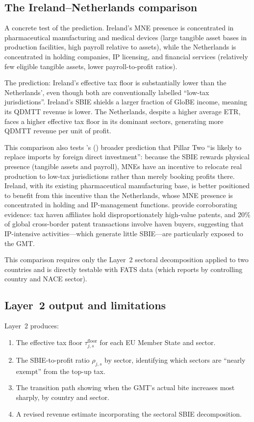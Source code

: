 \documentclass[11pt,a4paper]{article}
\begin{document}
\subsection{The Ireland--Netherlands comparison}\label{sec:irl_nld}

A concrete test of the \citet{schjelderup2024} prediction. Ireland's MNE presence is concentrated in pharmaceutical manufacturing and medical devices (large tangible asset bases in production facilities, high payroll relative to assets), while the Netherlands is concentrated in holding companies, IP licensing, and financial services (relatively few eligible tangible assets, lower payroll-to-profit ratios).

The prediction: Ireland's effective tax floor is substantially lower than the Netherlands', even though both are conventionally labelled ``low-tax jurisdictions''. Ireland's SBIE shields a larger fraction of GloBE income, meaning its QDMTT revenue is lower. The Netherlands, despite a higher average ETR, faces a higher effective tax floor in its dominant sectors, generating more QDMTT revenue per unit of profit.

This comparison also tests \citeauthor{schjelderup2024}'s (\citeyear{schjelderup2024}) broader prediction that Pillar Two ``is likely to replace imports by foreign direct investment'': because the SBIE rewards physical presence (tangible assets and payroll), MNEs have an incentive to relocate real production to low-tax jurisdictions rather than merely booking profits there. Ireland, with its existing pharmaceutical manufacturing base, is better positioned to benefit from this incentive than the Netherlands, whose MNE presence is concentrated in holding and IP-management functions. \citet{bilicka2023} provide corroborating evidence: tax haven affiliates hold disproportionately high-value patents, and 20\% of global cross-border patent transactions involve haven buyers, suggesting that IP-intensive activities---which generate little SBIE---are particularly exposed to the GMT.

This comparison requires only the Layer~2 sectoral decomposition applied to two countries and is directly testable with FATS data (which reports by controlling country and NACE sector).

\subsection{Layer~2 output and limitations}

Layer~2 produces:
\begin{enumerate}
\item The effective tax floor $\tau_{j,s}^{\text{floor}}$ for each EU Member State and sector.
\item The SBIE-to-profit ratio $\rho_{j,s}$ by sector, identifying which sectors are ``nearly exempt'' from the top-up tax.
\item The transition path showing when the GMT's actual bite increases most sharply, by country and sector.
\item A revised revenue estimate incorporating the sectoral SBIE decomposition.
\end{enumerate}
\end{document}
